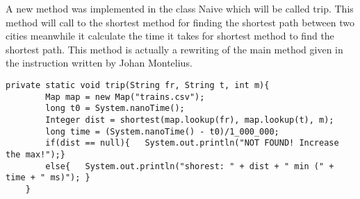 \documentclass[a4paper,11pt]{article}
\begin{document}
A new method was implemented in the class Naive which will be called trip. This method will call to the shortest method for finding the shortest path between two cities meanwhile it calculate the time it takes for shortest method to find the shortest path. This method is actually a rewriting of the main method given in the instruction written by Johan Montelius.
\begin{verbatim}
private static void trip(String fr, String t, int m){
        Map map = new Map("trains.csv");
        long t0 = System.nanoTime();
        Integer dist = shortest(map.lookup(fr), map.lookup(t), m);
        long time = (System.nanoTime() - t0)/1_000_000;
        if(dist == null){	System.out.println("NOT FOUND! Increase the max!");}
        else{	System.out.println("shorest: " + dist + " min (" + time + " ms)"); }
    }
\end{verbatim} 
\end{document}
